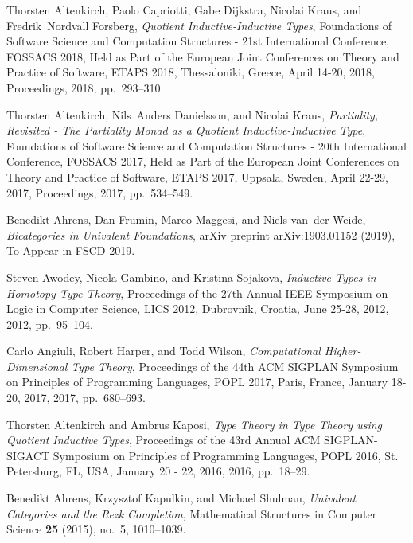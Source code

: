 \documentclass[9pt]{entcs}
\newcommand{\0}{\textbf{0}} %
\begin{document}
\begin{thebibliography}{10}\label{bibliography}
	
	Thorsten Altenkirch, Paolo Capriotti, Gabe Dijkstra, Nicolai Kraus, and
	Fredrik~Nordvall Forsberg, \emph{{Quotient Inductive-Inductive Types}},
	Foundations of Software Science and Computation Structures - 21st
	International Conference, {FOSSACS} 2018, Held as Part of the European Joint
	Conferences on Theory and Practice of Software, {ETAPS} 2018, Thessaloniki,
	Greece, April 14-20, 2018, Proceedings, 2018, pp.~293--310.
	
	Thorsten Altenkirch, Nils~Anders Danielsson, and Nicolai Kraus,
	\emph{{Partiality, Revisited - The Partiality Monad as a Quotient
			Inductive-Inductive Type}}, Foundations of Software Science and Computation
	Structures - 20th International Conference, {FOSSACS} 2017, Held as Part of
	the European Joint Conferences on Theory and Practice of Software, {ETAPS}
	2017, Uppsala, Sweden, April 22-29, 2017, Proceedings, 2017, pp.~534--549.
	
	Benedikt Ahrens, Dan Frumin, Marco Maggesi, and Niels van~der Weide,
	\emph{{Bicategories in Univalent Foundations}}, arXiv preprint
	arXiv:1903.01152 (2019), To Appear in FSCD 2019.
	
	Steven Awodey, Nicola Gambino, and Kristina Sojakova, \emph{{Inductive Types in
			Homotopy Type Theory}}, Proceedings of the 27th Annual {IEEE} Symposium on
	Logic in Computer Science, {LICS} 2012, Dubrovnik, Croatia, June 25-28, 2012,
	2012, pp.~95--104.
	
	Carlo Angiuli, Robert Harper, and Todd Wilson, \emph{{Computational
			Higher-Dimensional Type Theory}}, Proceedings of the 44th {ACM} {SIGPLAN}
	Symposium on Principles of Programming Languages, {POPL} 2017, Paris, France,
	January 18-20, 2017, 2017, pp.~680--693.
	
	Thorsten Altenkirch and Ambrus Kaposi, \emph{{Type Theory in Type Theory using
			Quotient Inductive Types}}, Proceedings of the 43rd Annual {ACM}
	{SIGPLAN-SIGACT} Symposium on Principles of Programming Languages, {POPL}
	2016, St. Petersburg, FL, USA, January 20 - 22, 2016, 2016, pp.~18--29.
	
	Benedikt Ahrens, Krzysztof Kapulkin, and Michael Shulman, \emph{{Univalent
			Categories and the Rezk Completion}}, Mathematical Structures in Computer
	Science \textbf{25} (2015), no.~5, 1010--1039.
	

\end{thebibliography}
\end{document}
